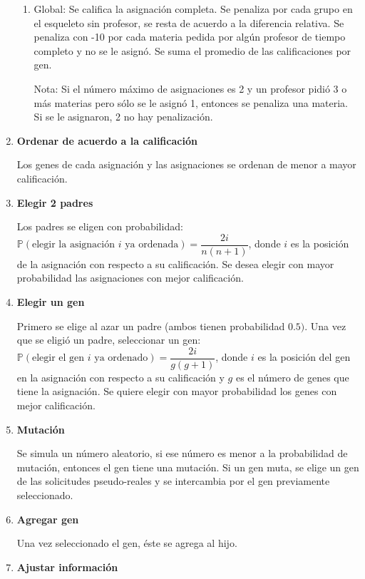 \begin{enumerate}
\begin{enumerate}
\item Global: Se califica la asignación completa. Se penaliza por cada grupo en el esqueleto sin profesor, se resta de acuerdo a la diferencia relativa. Se penaliza con -10 por cada materia pedida por algún profesor de tiempo completo y no se le asignó. Se suma el promedio de las calificaciones por gen.

Nota:
Si el número máximo de asignaciones es 2 y un profesor pidió 3 o más  materias pero sólo se le asignó 1, entonces se penaliza una materia. Si se le asignaron, 2 no hay penalización.
\end{enumerate}

\item \textbf{Ordenar de acuerdo a la calificación}

Los genes de cada asignación y las asignaciones se ordenan de menor a mayor calificación.

\item \textbf{Elegir 2 padres} \label{paso_elegir_padres}

Los padres se eligen con probabilidad: $\mathbb{P}(\text{elegir la asignación } i \text{ ya ordenada}) = \dfrac{2i}{n(n+1)}$, donde $i$ es la posición de la asignación con respecto a su calificación. Se desea elegir con mayor probabilidad las asignaciones con mejor calificación.

\item \textbf{Elegir un gen} \label{paso_elegir_gen}

Primero se elige al azar un padre (ambos tienen probabilidad $0.5)$. Una vez que se eligió un padre, seleccionar un gen: $\mathbb{P}(\text{elegir el gen } i \text{ ya ordenado}) = \dfrac{2i}{g(g+1)}$, donde $i$ es la posición del gen en la asignación con respecto a su calificación y $g$ es el número de genes que tiene la asignación. Se quiere elegir con mayor probabilidad los genes con mejor calificación.

\item \textbf{Mutación}

Se simula un número aleatorio, si ese número es menor a la probabilidad de mutación, entonces el gen tiene una mutación. Si un gen muta, se elige un gen de las solicitudes pseudo-reales y se intercambia por el gen previamente seleccionado.

\item \textbf{Agregar gen}

Una vez seleccionado el gen, éste se agrega al hijo.

\item \textbf{Ajustar información} \label{paso_ajusta_info}


\end{enumerate}
